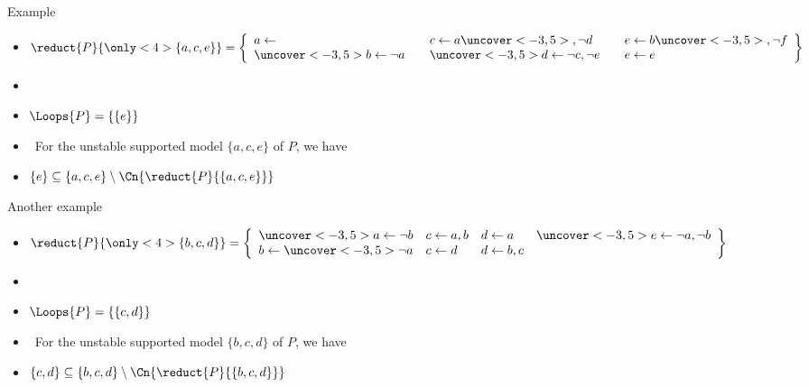 \begin{frame}{Example}
  \bigskip
  \begin{itemize}
  \item<1->
    \(
    \reduct{P}{\only<4>{\{a,c,e\}}}
    =
    \left\{
      \begin{array}{lll}
                       a \leftarrow                          \quad &
                       c \leftarrow a\uncover<-3,5>{, \neg d}\quad &
                       e \leftarrow b\uncover<-3,5>{, \neg f}
        \\
        \uncover<-3,5>{b \leftarrow \neg a}                  \quad &
        \uncover<-3,5>{d \leftarrow \neg c, \neg e}          \quad &
        e \leftarrow e
      \end{array}
    \right\}
    \)
    \bigskip
  \item<1-> []
    \begin{center}
      
    \end{center}
  \item<2-> $\Loops{P}=\{\{e\}\}$
    \medskip
  \item<3->  \
    For the unstable supported model $\{a,c,e\}$ of $P$, we have
  \item<3->[] \phantom{Note}\;
    \(
    \{e\}\subseteq\{a,c,e\}\setminus\Cn{\reduct{P}{\{a,c,e\}}}
    \)
  \end{itemize}
\end{frame}
\begin{frame}{Another example}
  \bigskip
  \begin{itemize}
  \item<1->
    \(
    \reduct{P}{\only<4>{\{b,c,d\}}}
    =
    \left\{
      \begin{array}{llll}
        \uncover<-3,5>{a \leftarrow \neg b}
      &                c \leftarrow a,b
      &                d \leftarrow a
      & \uncover<-3,5>{e \leftarrow\neg a,\neg b}
      \\
                       b \leftarrow \uncover<-3,5>{\neg a}
      &                c \leftarrow                     d
      &                d \leftarrow                   b,c
      &
      \end{array}
    \right\}
    \)
    \bigskip
  \item<1-> []
    \begin{center}
      
    \end{center}
    \smallskip
  \item<2-> $\Loops{P}=\{\{c,d\}\}$
    \medskip
  \item<3->  \
    For the unstable supported model $\{b,c,d\}$ of $P$, we have
  \item<3->[] \phantom{Note}\;
    \(
    \{c,d\}\subseteq\{b,c,d\}\setminus\Cn{\reduct{P}{\{b,c,d\}}}
    \)
  \end{itemize}
\end{frame}
